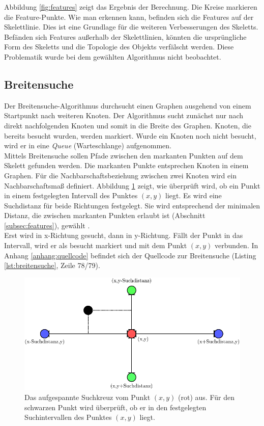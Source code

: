 Abbildung \ref{fig:features} zeigt das Ergebnis der Berechnung. Die Kreise markieren die Feature-Punkte. Wie man erkennen kann, befinden sich die Features auf der Skelettlinie. Dies ist eine Grundlage für die weiteren
Verbesserungen des Skeletts. Befänden sich Features außerhalb der Skelettlinien, könnten die ursprüngliche Form des Skeletts und die Topologie des Objekts verfälscht werden. Diese Problematik wurde bei dem gewählten
Algorithmus \cite{extracting_skeletons_distancemaps} nicht beobachtet.
\subsection{Breitensuche}
\label{subsec:breitesuche}
Der Breitensuche-Algorithmus durchsucht einen Graphen ausgehend von einem Startpunkt nach weiteren 
Knoten. Der Algorithmus sucht zunächst nur nach direkt nachfolgenden Knoten und somit in die Breite des
Graphen. Knoten, die bereits besucht wurden, werden markiert. Wurde ein Knoten noch nicht besucht, wird er
in eine \emph{Queue} (Warteschlange) aufgenommen.\\
Mittels Breitensuche sollen Pfade zwischen den markanten Punkten auf dem Skelett gefunden werden. Die markanten Punkte entsprechen Knoten in einem Graphen. Für die Nachbarschaftsbeziehung zwischen zwei
Knoten wird ein Nachbarschaftsmaß definiert. Abbildung \ref{fig:suchdistanz_naechster_nachbar} zeigt, wie überprüft wird, ob ein Punkt in einem festgelegten Intervall des Punktes $(x,y)$ liegt. Es wird eine Suchdistanz für beide Richtungen festgelegt. Sie
wird entsprechend der minimalen Distanz, die zwischen markanten Punkten erlaubt ist (Abschnitt \ref{subsec:features}), gewählt . \\
Erst wird in x-Richtung gesucht, dann in y-Richtung. Fällt der Punkt in das Intervall, wird er als besucht markiert und
mit dem Punkt $(x,y)$ verbunden. 
In Anhang \ref{anhang:quellcode} befindet sich der Quellcode zur Breitensuche (Listing \ref{lst:breitensuche}, Zeile 78/79).
\begin{figure}[htbp]
\centering
\includegraphics[width=1.0\linewidth]{./fig/suchdistanz_naechster_nachbar}
\caption{Das aufgespannte Suchkreuz vom Punkt $(x,y)$ (rot) aus. Für den schwarzen Punkt wird überprüft, ob er in den festgelegten Suchintervallen des Punktes $(x,y)$ liegt.}
\label{fig:suchdistanz_naechster_nachbar}
\end{figure}\\

